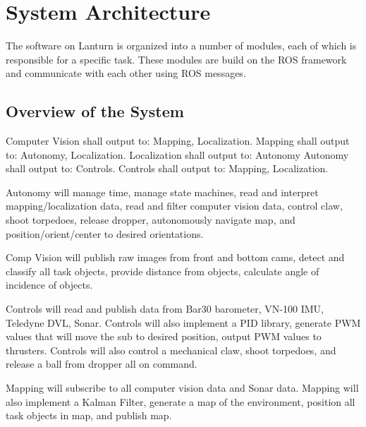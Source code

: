 \section{System Architecture}
\label{sec:architecture}

The software on Lanturn is organized into a number of modules, each of which is
responsible for a specific task. These modules are build on the ROS framework
and communicate with each other using ROS messages.

\subsection{Overview of the System}
\label{sec:overview}
 
Computer Vision shall output to: Mapping, Localization. Mapping shall output
to: Autonomy, Localization. Localization shall output to: Autonomy Autonomy
shall output to: Controls. Controls shall output to: Mapping, Localization.
\par

Autonomy will manage time, manage state machines, read and interpret
mapping/localization data, read and filter computer vision data, control claw,
shoot torpedoes, release dropper,  autonomously navigate map, and
position/orient/center to desired orientations. 
\par

Comp Vision will publish raw images from front and bottom cams, detect and
classify all task objects, provide distance from objects, calculate angle of
incidence of objects. 
\par

Controls will read and publish data from Bar30 barometer, VN-100 IMU, Teledyne
DVL, Sonar. Controls will also implement a PID library, generate PWM values
that will move the sub to desired position, output PWM values to thrusters.
Controls will also control a mechanical claw, shoot torpedoes, and release a
ball from dropper all on command. 
\par

Mapping will subscribe to all computer vision data and Sonar data. Mapping will
also implement a Kalman Filter, generate a map of the environment, position all
task objects in map, and publish map. 
\par

